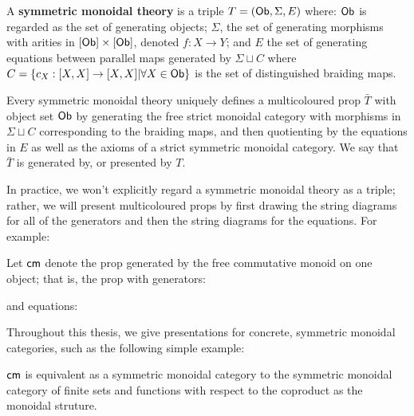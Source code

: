 \begin{definition}
\label{def:monoidaltheory}


A {\bf symmetric monoidal theory} is a triple $T=({\sf Ob},\Sigma ,E )$ where: ${\sf Ob}$ is regarded as the set of generating objects; $\Sigma$, the set of generating morphisms with arities in $[{\sf Ob}]\times [{\sf Ob}]$, denoted $f:X\to Y$;  and $E$ the set of generating equations between parallel maps generated by $\Sigma \sqcup C$  where $C=\{c_X:[X,X]\to [X,X]|\forall X \in {\sf Ob}\}$ is the set of distinguished braiding maps.

Every symmetric monoidal theory uniquely defines a multicoloured prop $\bar T$ with object set $\sf Ob$ by generating the free strict monoidal category with morphisms in $\Sigma\sqcup C$   corresponding to the braiding maps, and then quotienting by the equations in $E$ as well as the axioms of a strict symmetric  monoidal category.  We say that $\bar T$ is generated by, or presented by $T$.
\end{definition}

In practice, we won't explicitly regard a symmetric monoidal theory as a triple; rather, we will present multicoloured props by first drawing the string diagrams for all of the generators and then the string diagrams for the equations. For example:

\begin{example}
Let ${\sf cm}$ denote the prop generated by the free commutative monoid on one object; that is, the prop with generators:


and equations:



\end{example}

Throughout this thesis, we give presentations for concrete, symmetric monoidal categories, such as the following simple example:

\begin{lemma}
${\sf cm}$ is equivalent as a symmetric monoidal category to the symmetric monoidal category of finite sets and functions with respect to the coproduct as the monoidal struture.
\end{lemma}
%
%


